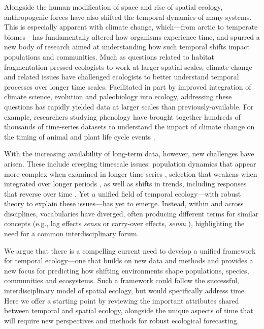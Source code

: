 \documentclass[11pt,a4paper,oneside]{article}
\begin{document}
Alongside the human modification of space and rise of spatial ecology, anthropogenic forces have also shifted the temporal dynamics of many systems. This is especially apparent with climate change, which---from arctic to temperate biomes---has fundamentally altered how organisms experience time, and spurred a new body of research aimed at understanding how such temporal shifts impact populations and communities. Much as questions related to habitat fragmentation pressed ecologists to work at larger spatial scales, climate change and related issues have challenged ecologists to better understand temporal processes over longer time scales. Facilitated in part by improved integration of climate science, evolution and paleobiology into ecology, addressing these questions has rapidly yielded data at larger scales than previously-available. For example, researchers studying phenology have brought together hundreds of thousands of time-series datasets to understand the impact of climate change on the timing of animal and plant life cycle events \citep{Menzel:2006sq}. 

With the increasing availability of long-term data, however, new challenges have arisen. These include creeping timescale issues: population dynamics that appear more complex when examined in longer time series \citep{Ziebarth2010}, selection that weakens when integrated over longer periods \citep{schoener2011,Uyeda2011}, as well as shifts in trends, including responses that reverse over time \citep{yu2010}. Yet a unified field of temporal ecology---with robust theory to explain these issues---has yet to emerge. Instead, within and across disciplines, vocabularies have diverged, often producing different terms for similar concepts (e.g., lag effects \emph{sensu} \cite{Reichmann2013} or carry-over effects, \emph{sensu} \cite{Betini2013}), highlighting the need for a common interdisciplinary forum. 

We argue that there is a compelling current need to develop a unified framework for temporal ecology---one that builds on new data and methods and provides a new focus for predicting how shifting environments shape populations, species, communities and ecosystems. Such a framework could follow the successful, interdisciplinary model of spatial ecology, but would specifically address time. Here we offer a starting point by reviewing the important attributes shared between temporal and spatial ecology, alongside the unique aspects of time that will require new perspectives and methods for robust ecological forecasting. \\
\end{document}
